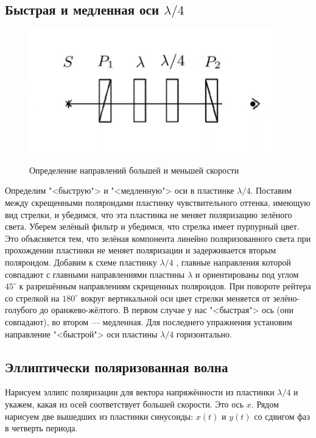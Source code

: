 \documentclass[a4paper]{article}
\begin{document}
\subsection{Быстрая и медленная оси $ \lambda/4 $}

\begin{figure}
	\caption{Определение направлений
большей и меньшей скорости}
\includegraphics[width=\linewidth]{8}
	\label{ris 8}
\end{figure}

Определим "<быструю"> и "<медленную"> оси в пластинке $ \lambda/4 $. Поставим между скрещенными поляроидами пластинку чувствительного оттенка, имеющую вид стрелки, и убедимся, что эта пластинка не меняет поляризацию зелёного света. Уберем зелёный фильтр и убедимся, что стрелка имеет пурпурный цвет. Это объясняется тем, что зелёная компонента линейно поляризованного света при прохождении пластинки не меняет поляризации и задерживается вторым поляроидом. Добавим к схеме пластинку $ \lambda/4 $ , главные направления которой совпадают с главными направлениями пластины $ \lambda $ и ориентированы под углом $ 45^\circ $ к разрешённым направлениям скрещенных поляроидов. При повороте рейтера со стрелкой на $ 180^\circ $ вокруг вертикальной оси цвет стрелки меняется от зелёно-голубого до оранжево-жёлтого. В первом случае у нас "<быстрая"> ось (они совпадают), во втором --- медленная. Для последнего упражнения установим направление "<быстрой"> оси пластины $ \lambda/4 $ горизонтально.
\subsection{Эллиптически поляризованная волна}

Нарисуем эллипс поляризации для вектора напряжённости из пластинки $ \lambda/4 $ и укажем, какая из осей соответствует большей скорости. Это ось $ x $. Рядом нарисуем две вышедших из пластинки синусоиды: $ x(t) $ и $ y(t) $ со сдвигом фаз в четверть периода. \\
\end{document}
